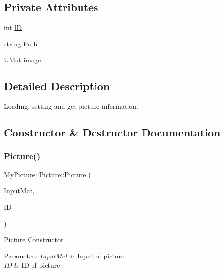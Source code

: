 \subsection*{Private Attributes}
\begin{DoxyCompactItemize}
\item 
int \hyperlink{class_my_picture_1_1_picture_af5d633176718164404aa3ec4b5fb6581}{ID}
\item 
string \hyperlink{class_my_picture_1_1_picture_a7917ba800ec5284d496f744004c8b6ff}{Path}
\item 
U\+Mat \hyperlink{class_my_picture_1_1_picture_a0596068248ec76f6020a06c6afd217aa}{image}
\end{DoxyCompactItemize}


\subsection{Detailed Description}
Loading, setting and get picture information. 

\subsection{Constructor \& Destructor Documentation}
\mbox{\label{class_my_picture_1_1_picture_a6332cb0fe8f5762aedc0c37b8a8cf0b8}} 
\subsubsection{\texorpdfstring{Picture()}{Picture()}\hspace{0.1cm}{\footnotesize\ttfamily [1/3]}}
{\footnotesize\ttfamily My\+Picture\+::\+Picture\+::\+Picture (\begin{DoxyParamCaption}\item[{U\+Mat}]{Input\+Mat,  }\item[{int}]{ID }\end{DoxyParamCaption})\hspace{0.3cm}{\ttfamily [inline]}}



\hyperlink{class_my_picture_1_1_picture}{Picture} Constructor. 


\begin{DoxyParams}{Parameters}
{\em Input\+Mat} & Input of picture \\
\hline
{\em ID} & ID of picture \\
\hline
\end{DoxyParams}
\mbox{\label{class_my_picture_1_1_picture_af545df4aa81b67618cb99686a8d56303}} 
